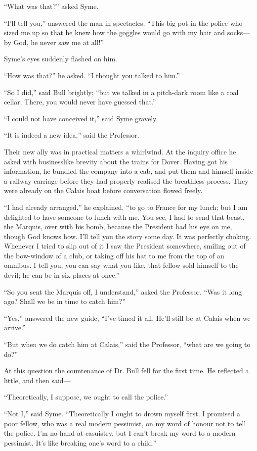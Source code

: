 “What was that?” asked Syme.

“I’ll tell you,” answered the man in spectacles. “This big pot in the police who sized me up so that he knew how the goggles would go with my hair and socks⁠—by God, he never saw me at all!”

Syme’s eyes suddenly flashed on him.

“How was that?” he asked. “I thought you talked to him.”

“So I did,” said Bull brightly; “but we talked in a pitch-dark room like a coal cellar. There, you would never have guessed that.”

“I could not have conceived it,” said Syme gravely.

“It is indeed a new idea,” said the Professor.

Their new ally was in practical matters a whirlwind. At the inquiry office he asked with businesslike brevity about the trains for Dover. Having got his information, he bundled the company into a cab, and put them and himself inside a railway carriage before they had properly realised the breathless process. They were already on the Calais boat before conversation flowed freely.

“I had already arranged,” he explained, “to go to France for my lunch; but I am delighted to have someone to lunch with me. You see, I had to send that beast, the Marquis, over with his bomb, because the President had his eye on me, though God knows how. I’ll tell you the story some day. It was perfectly choking. Whenever I tried to slip out of it I saw the President somewhere, smiling out of the bow-window of a club, or taking off his hat to me from the top of an omnibus. I tell you, you can say what you like, that fellow sold himself to the devil; he can be in six places at once.”

“So you sent the Marquis off, I understand,” asked the Professor. “Was it long ago? Shall we be in time to catch him?”

“Yes,” answered the new guide, “I’ve timed it all. He’ll still be at Calais when we arrive.”

“But when we do catch him at Calais,” said the Professor, “what are we going to do?”

At this question the countenance of Dr. Bull fell for the first time. He reflected a little, and then said⁠—

“Theoretically, I suppose, we ought to call the police.”

“Not I,” said Syme. “Theoretically I ought to drown myself first. I promised a poor fellow, who was a real modern pessimist, on my word of honour not to tell the police. I’m no hand at casuistry, but I can’t break my word to a modern pessimist. It’s like breaking one’s word to a child.”

